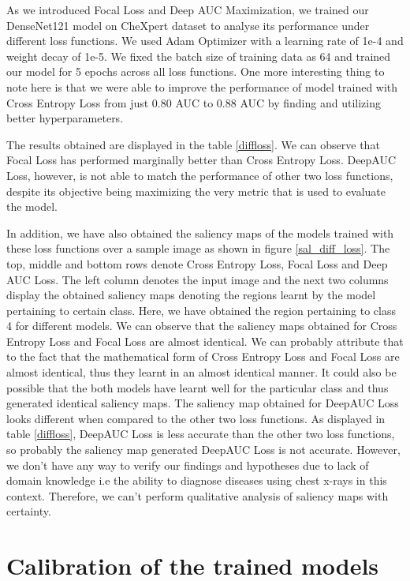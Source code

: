 As we introduced Focal Loss and Deep AUC Maximization, we trained our DenseNet121 model on CheXpert dataset to analyse its performance under different loss functions. We used Adam Optimizer with a learning rate of 1e-4 and weight decay of 1e-5. We fixed the batch size of training data as 64 and trained our model for 5 epochs across all loss functions. One more interesting thing to note here is that we were able to improve the performance of model trained with Cross Entropy Loss from just 0.80 AUC to 0.88 AUC by finding and utilizing better hyperparameters. 

The results obtained are displayed in the table \ref{diffloss}. We can observe that Focal Loss has performed marginally better than Cross Entropy Loss. DeepAUC Loss, however, is not able to match the performance of other two loss functions, despite its objective being maximizing the very metric that is used to evaluate the model. 

In addition, we have also obtained the saliency maps of the models trained with these loss functions over a sample image as shown in figure \ref{sal_diff_loss}. The top, middle and bottom rows denote Cross Entropy Loss, Focal Loss and Deep AUC Loss. The left column denotes the input image and the next two columns display the obtained saliency maps denoting the regions learnt by the model pertaining to certain class. Here, we have obtained the region pertaining to class 4 for different models. We can observe that the saliency maps obtained for Cross Entropy Loss and Focal Loss are almost identical. We can probably attribute that to the fact that the mathematical form of Cross Entropy Loss and Focal Loss are almost identical, thus they learnt in an almost identical manner. It could also be possible that the both models have learnt well for the particular class and thus generated identical saliency maps. The saliency map obtained for DeepAUC Loss looks different when compared to the other two loss functions. As displayed in table \ref{diffloss}, DeepAUC Loss is less accurate than the other two loss functions, so probably the saliency map generated DeepAUC Loss is not accurate. However, we don't have any way to verify our findings and hypotheses due to lack of domain knowledge i.e the ability to diagnose diseases using chest x-rays in this context. Therefore, we can't perform qualitative analysis of saliency maps with certainty. 

\section{Calibration of the trained models}

